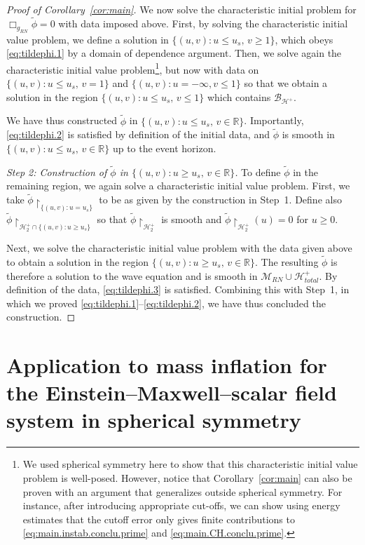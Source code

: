 \documentclass[10pt, reqno]{amsart}
\theoremstyle{definition}
\theoremstyle{remark}
\numberwithin{equation}{section}
\newcommand{\0}{\emptyset}
\newcommand{\calH}{\mathcal H}
\newcommand{\EH}{\calH^{+}}
\newcommand{\pfstep}[1]{\vspace{.5em} {\it #1.}}
\begin{document}
\begin{proof}[Proof of Corollary~\ref{cor:main}]
We now solve the characteristic initial problem for $\Box_{g_{RN}}\widetilde{\phi} = 0$ with data imposed above. First, by solving the characteristic initial value problem, we define a solution in $\{(u,v): u\leq u_s,\,v\geq 1\}$, which obeys \eqref{eq:tildephi.1} by a domain of dependence argument. Then, we solve again the characteristic initial value problem\footnote{We used spherical symmetry here to show that this characteristic initial value problem is well-posed. However, notice that Corollary~\ref{cor:main} can also be proven with an argument that generalizes outside spherical symmetry. For instance, after introducing appropriate cut-offs, we can show using energy estimates that the cutoff error only gives finite contributions to \eqref{eq:main.instab.conclu.prime} and \eqref{eq:main.CH.conclu.prime}.}, but now with data on $\{(u,v): u\leq u_s,\, v=1\}$ and $\{(u,v): u=-\infty,v\leq 1\}$ so that we obtain a solution in the region $\{(u,v): u\leq u_s,\,v\leq 1\}$ which contains $\mathcal B_{\EH}$. 

We have thus constructed $\widetilde{\phi}$ in $\{(u,v): u \leq u_s,\, v\in \mathbb R\}$. Importantly, \eqref{eq:tildephi.2} is satisfied by definition of the initial data, and $\widetilde{\phi}$ is smooth in $\{(u,v): u \leq u_s,\, v\in \mathbb R\}$ up to the event horizon.

\pfstep{Step 2: Construction of $\widetilde{\phi}$ in $\{(u,v): u \geq u_s,\, v\in \mathbb R\}$} To define $\widetilde{\phi}$ in the remaining region, we again solve a characteristic initial value problem. First, we take $\widetilde{\phi}\restriction_{\{(u,v): u=u_s\}}$ to be as given by the construction in Step~1. Define also $\widetilde{\phi} \restriction_{\EH_2\cap \{(u,v): u\geq u_s\} }$ so that $\widetilde{\phi} \restriction_{\EH_2}$ is smooth and $\widetilde{\phi} \restriction_{\EH_2}(u) = 0$ for $u\geq 0$.

Next, we solve the characteristic initial value problem with the data given above to obtain a solution in the region $\{(u,v): u \geq u_s,\, v\in \mathbb R\}$. The resulting $\widetilde{\phi}$ is therefore a solution to the wave equation and is smooth in $\mathcal M_{RN} \cup \EH_{total}$. By definition of the data, \eqref{eq:tildephi.3} is satisfied. Combining this with Step~1, in which we proved \eqref{eq:tildephi.1}--\eqref{eq:tildephi.2}, we have thus concluded the construction. \qedhere
\end{proof}

\section{Application to mass inflation for the Einstein--Maxwell--scalar field system in spherical symmetry}\label{sec.application}
\end{document}
